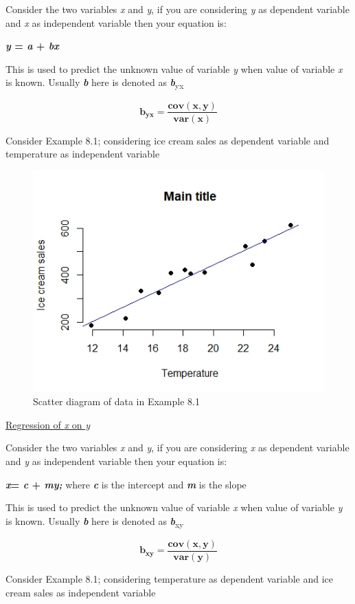 \documentclass[
]{book}
\begin{document}
Consider the two variables \emph{x} and \emph{y}, if you are considering \emph{y} as
dependent variable and \emph{x} as independent variable then your equation
is:

\textbf{\emph{y} = \emph{a} + \emph{bx}}

This is used to predict the unknown value of variable \emph{y} when value of
variable \emph{x} is known. Usually \textbf{\emph{b}} here is denoted as \textbf{\emph{b}}\textsubscript{yx}

\[\mathbf{b}_{\mathbf{\text{yx}}}\mathbf{=}\frac{\mathbf{cov(x,y)}}{\mathbf{var(x)}}\]

Consider Example 8.1; considering ice cream sales as dependent variable
and temperature as independent variable

\begin{figure}

{\centering \includegraphics[width=0.5\linewidth]{images/r7} 

}

\caption{Scatter diagram of data in Example 8.1}\label{fig:r6}
\end{figure}

\underline{Regression of \emph{x} on \emph{y}}

Consider the two variables \emph{x} and \emph{y}, if you are considering \emph{x} as
dependent variable and \emph{y} as independent variable then your equation
is:

\textbf{\emph{x}= \emph{c} + \emph{my; }}where \textbf{\emph{c}} is the intercept and \textbf{\emph{m}} is the
slope

This is used to predict the unknown value of variable \emph{x} when value of
variable \emph{y} is known. Usually \textbf{\emph{b}} here is denoted as \textbf{\emph{b}}\textsubscript{xy}

\[\mathbf{b}_{\mathbf{\text{xy}}}\mathbf{=}\frac{\mathbf{cov(x,y)}}{\mathbf{var(y)}}\]

Consider Example 8.1; considering temperature as dependent variable and
ice cream sales as independent variable
\end{document}
